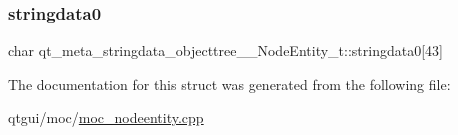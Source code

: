 \subsubsection{\texorpdfstring{stringdata0}{stringdata0}}
{\footnotesize\ttfamily char qt\+\_\+meta\+\_\+stringdata\+\_\+objecttree\+\_\+\+\_\+\+Node\+Entity\+\_\+t\+::stringdata0\mbox{[}43\mbox{]}}



The documentation for this struct was generated from the following file\+:\begin{DoxyCompactItemize}
\item 
qtgui/moc/\mbox{\hyperlink{moc__nodeentity_8cpp}{moc\+\_\+nodeentity.\+cpp}}\end{DoxyCompactItemize}
